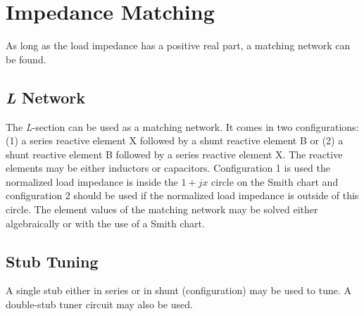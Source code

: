 \documentclass{article}
\begin{document}
	\section{Impedance Matching}
As long as the load impedance has a positive real part, a matching network can be found.
		\subsection{\emph{L} Network}
The \emph{L}-section can be used as a matching network. It comes in two configurations: (1) a series reactive element X followed by a shunt reactive element B or (2) a shunt reactive element B followed by a series reactive element X. The reactive elements may be either inductors or capacitors. Configuration 1 is used the normalized load impedance is inside the $1+jx$ circle on the Smith chart and configuration 2 should be used if the normalized load impedance is outside of this circle. The element values of the matching network may be solved either algebraically or with the use of a Smith chart.
		\subsection{Stub Tuning}
A single stub either in series or in shunt (configuration) may be used to tune. A double-stub tuner circuit may also be used.
\end{document}
